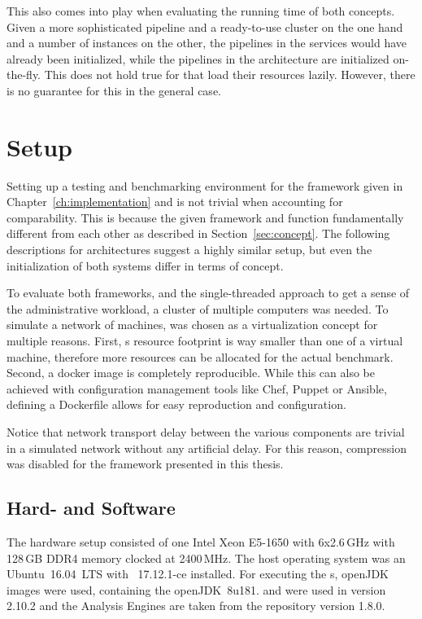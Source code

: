 This also comes into play when evaluating the running time of both concepts. Given a more sophisticated pipeline and a ready-to-use \spark{} cluster on the one hand and a number of \uimaas{} instances on the other, the pipelines in the \uimaas{} services would have already been initialized, while the pipelines in the \spark{} architecture are initialized on-the-fly. This does not hold true for \anens{} that load their resources lazily. However, there is no guarantee for this in the general case.

\section{Setup}
\label{sec:setup}

Setting up a testing and benchmarking environment for the framework given in Chapter~\ref{ch:implementation} and \uimaas{} is not trivial when accounting for comparability. This is because the given framework and \uimaas{} function fundamentally different from each other as described in Section~\ref{sec:concept}. The following descriptions for \docker{} architectures suggest a highly similar setup, but even the initialization of both systems differ in terms of concept. 

To evaluate both frameworks, and the single-threaded approach to get a sense of the administrative workload, a cluster of multiple computers was needed. To simulate a network of machines, \docker{} was chosen as a virtualization concept for multiple reasons. First, \docker{}s resource footprint is way smaller than one of a virtual machine, therefore more resources can be allocated for the actual benchmark. Second, a docker image is completely reproducible. While this can also be achieved with configuration management tools like Chef, Puppet or Ansible, defining a Dockerfile allows for easy reproduction and configuration. 

Notice that network transport delay between the various components are trivial in a simulated network without any artificial delay. For this reason, compression was disabled for the framework presented in this thesis.

\subsection{Hard- and Software}
The hardware setup consisted of one Intel Xeon E5-1650 with 6x2.6\,GHz with 128\,GB DDR4 memory clocked at 2400\,MHz. The host operating system was an Ubuntu~16.04~LTS with \docker{}~17.12.1-ce installed. For executing the \jvm{}s, openJDK \docker{} images were used, containing the openJDK~8u181. \uima{} and \uimaas{} were used in version 2.10.2 and the \dkpro{} Analysis Engines are taken from the repository version 1.8.0.

